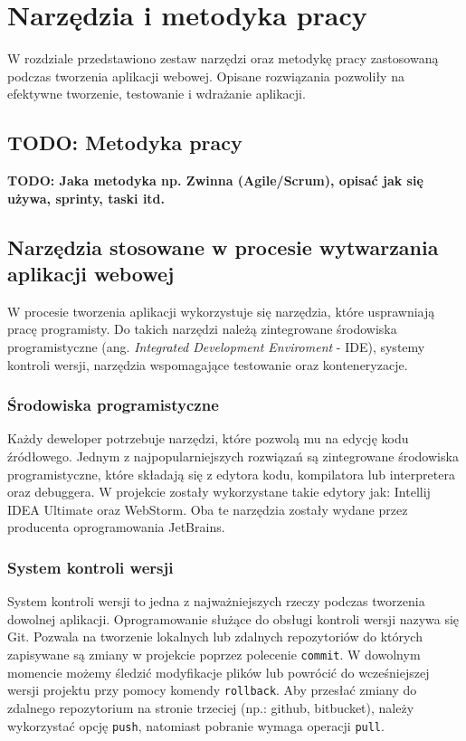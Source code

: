 \chapter{Narzędzia i metodyka pracy}
W rozdziale przedstawiono zestaw narzędzi oraz metodykę pracy zastosowaną podczas tworzenia aplikacji webowej. Opisane rozwiązania pozwoliły na efektywne tworzenie, testowanie i wdrażanie aplikacji.
\section{TODO: Metodyka pracy}
\textbf{TODO: Jaka metodyka np. Zwinna (Agile/Scrum), opisać jak się używa, sprinty, taski itd.}
\section{Narzędzia stosowane w procesie wytwarzania aplikacji webowej}
W procesie tworzenia aplikacji wykorzystuje się narzędzia, które usprawniają pracę programisty. Do takich narzędzi należą zintegrowane środowiska programistyczne (ang. \textit{Integrated Development Enviroment} - IDE), systemy kontroli wersji, narzędzia wspomagające testowanie oraz konteneryzacje.
\subsection*{Środowiska programistyczne}
Każdy deweloper potrzebuje narzędzi, które pozwolą mu na edycję kodu źródłowego. Jednym z najpopularniejszych rozwiązań są zintegrowane środowiska programistyczne, które składają się z edytora kodu, kompilatora lub interpretera oraz debuggera. W projekcie zostały wykorzystane takie edytory jak: Intellij IDEA Ultimate oraz WebStorm. Oba te narzędzia zostały wydane przez producenta oprogramowania JetBrains. 
\subsection*{System kontroli wersji}
System kontroli wersji to jedna z najważniejszych rzeczy podczas tworzenia dowolnej aplikacji. Oprogramowanie służące do obsługi kontroli wersji nazywa się Git. Pozwala na tworzenie lokalnych lub zdalnych repozytoriów do których zapisywane są zmiany w projekcie poprzez polecenie \texttt{commit}. W dowolnym momencie możemy śledzić modyfikacje plików lub powrócić do wcześniejszej wersji projektu przy pomocy komendy \texttt{rollback}. Aby przesłać zmiany do zdalnego repozytorium na stronie trzeciej (np.: github, bitbucket), należy wykorzystać opcję \texttt{push}, natomiast pobranie wymaga operacji \texttt{pull}. 

